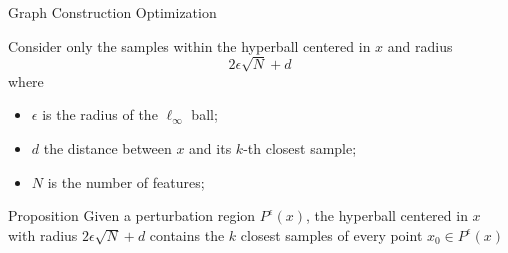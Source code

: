 \appendix

\begin{frame}{Graph Construction Optimization}

  Consider only the samples within the hyperball centered in $x$ and radius
               \[
                     2\epsilon\sqrt{N} + d
               \]
  where \begin{itemize}
     \item $\epsilon$ is the radius of the $\ell_{\infty}$ ball;
     \item $d$ the distance between $x$ and its $k$-th closest sample;
     \item $N$ is the number of features;
  \end{itemize}
  \begin{alertblock}{Proposition}
     Given a perturbation region $P^{\epsilon}(x)$, the hyperball centered in $x$ with radius $2\epsilon\sqrt{N} + d$
     contains the $k$ closest samples of every point $x_0 \in P^{\epsilon}(x)$
  \end{alertblock}
 \end{frame}

